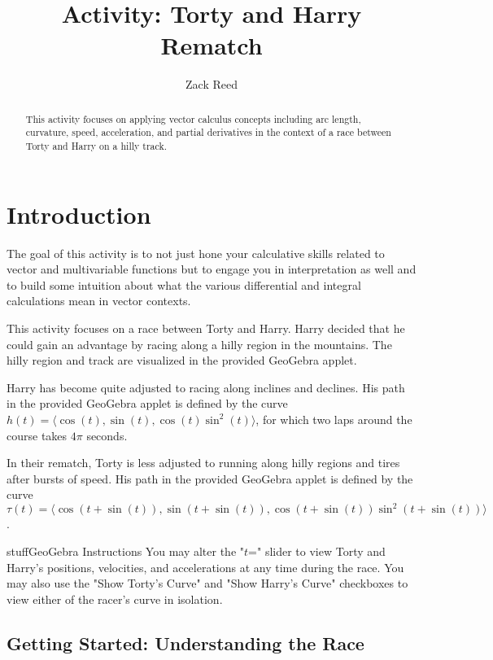 \documentclass{ximera}
\title{Activity: Torty and Harry Rematch}
\author{Zack Reed}
\begin{document}
\begin{abstract}
This activity focuses on applying vector calculus concepts including arc length, curvature, speed, acceleration, and partial derivatives in the context of a race between Torty and Harry on a hilly track.
\end{abstract}
\maketitle

\section{Introduction}

The goal of this activity is to not just hone your calculative skills related to vector and multivariable functions but to engage you in interpretation as well and to build some intuition about what the various differential and integral calculations mean in vector contexts.

This activity focuses on a race between Torty and Harry. Harry decided that he could gain an advantage by racing along a hilly region in the mountains. The hilly region and track are visualized in the provided GeoGebra applet.

Harry has become quite adjusted to racing along inclines and declines. His path in the provided GeoGebra applet is defined by the curve $h(t)=\langle \cos(t), \sin(t), \cos(t)\sin^2(t)\rangle$, for which two laps around the course takes $4 \pi$ seconds.

In their rematch, Torty is less adjusted to running along hilly regions and tires after bursts of speed. His path in the provided GeoGebra applet is defined by the curve $\tau (t)=\langle \cos(t+\sin(t)), \sin(t+\sin(t)), \cos(t+\sin(t))\sin^2(t+\sin(t))\rangle$.

\begin{expandable}{stuff}{GeoGebra Instructions}
    You may alter the "$t$=" slider to view Torty and Harry's positions, velocities, and accelerations at any time during the race. You may also use the "Show Torty's Curve" and "Show Harry's Curve" checkboxes to view either of the racer's curve in isolation.
\end{expandable}

\begin{center}
\end{center}

\subsection*{Getting Started: Understanding the Race}
\end{document}
